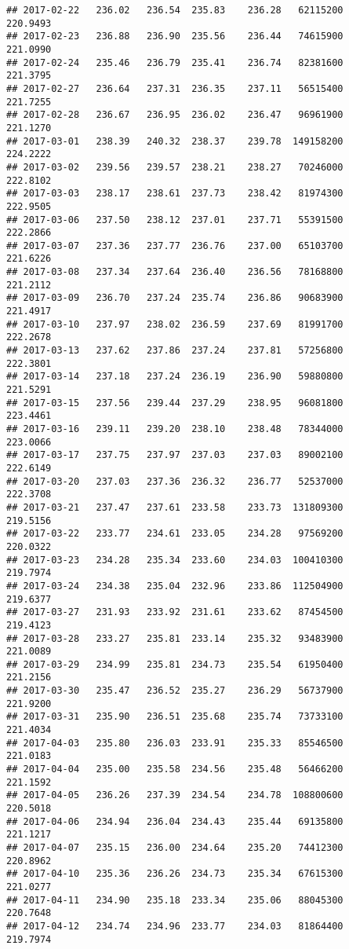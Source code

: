 \documentclass[
]{article}
\begin{document}
\begin{verbatim}
## 2017-02-22   236.02   236.54  235.83    236.28   62115200     220.9493
## 2017-02-23   236.88   236.90  235.56    236.44   74615900     221.0990
## 2017-02-24   235.46   236.79  235.41    236.74   82381600     221.3795
## 2017-02-27   236.64   237.31  236.35    237.11   56515400     221.7255
## 2017-02-28   236.67   236.95  236.02    236.47   96961900     221.1270
## 2017-03-01   238.39   240.32  238.37    239.78  149158200     224.2222
## 2017-03-02   239.56   239.57  238.21    238.27   70246000     222.8102
## 2017-03-03   238.17   238.61  237.73    238.42   81974300     222.9505
## 2017-03-06   237.50   238.12  237.01    237.71   55391500     222.2866
## 2017-03-07   237.36   237.77  236.76    237.00   65103700     221.6226
## 2017-03-08   237.34   237.64  236.40    236.56   78168800     221.2112
## 2017-03-09   236.70   237.24  235.74    236.86   90683900     221.4917
## 2017-03-10   237.97   238.02  236.59    237.69   81991700     222.2678
## 2017-03-13   237.62   237.86  237.24    237.81   57256800     222.3801
## 2017-03-14   237.18   237.24  236.19    236.90   59880800     221.5291
## 2017-03-15   237.56   239.44  237.29    238.95   96081800     223.4461
## 2017-03-16   239.11   239.20  238.10    238.48   78344000     223.0066
## 2017-03-17   237.75   237.97  237.03    237.03   89002100     222.6149
## 2017-03-20   237.03   237.36  236.32    236.77   52537000     222.3708
## 2017-03-21   237.47   237.61  233.58    233.73  131809300     219.5156
## 2017-03-22   233.77   234.61  233.05    234.28   97569200     220.0322
## 2017-03-23   234.28   235.34  233.60    234.03  100410300     219.7974
## 2017-03-24   234.38   235.04  232.96    233.86  112504900     219.6377
## 2017-03-27   231.93   233.92  231.61    233.62   87454500     219.4123
## 2017-03-28   233.27   235.81  233.14    235.32   93483900     221.0089
## 2017-03-29   234.99   235.81  234.73    235.54   61950400     221.2156
## 2017-03-30   235.47   236.52  235.27    236.29   56737900     221.9200
## 2017-03-31   235.90   236.51  235.68    235.74   73733100     221.4034
## 2017-04-03   235.80   236.03  233.91    235.33   85546500     221.0183
## 2017-04-04   235.00   235.58  234.56    235.48   56466200     221.1592
## 2017-04-05   236.26   237.39  234.54    234.78  108800600     220.5018
## 2017-04-06   234.94   236.04  234.43    235.44   69135800     221.1217
## 2017-04-07   235.15   236.00  234.64    235.20   74412300     220.8962
## 2017-04-10   235.36   236.26  234.73    235.34   67615300     221.0277
## 2017-04-11   234.90   235.18  233.34    235.06   88045300     220.7648
## 2017-04-12   234.74   234.96  233.77    234.03   81864400     219.7974

\end{verbatim}
\end{document}
